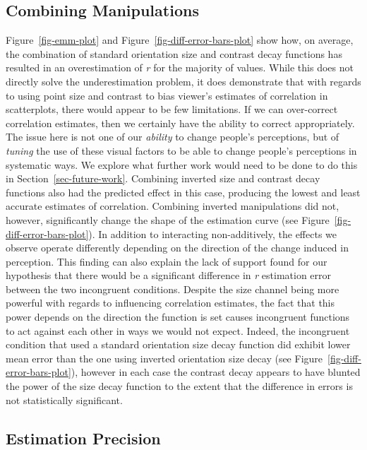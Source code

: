 \documentclass[manuscript, review, anonymous, screen]{acmart}
\begin{document}
\hypertarget{sec-combining}{%
\subsection{Combining Manipulations}\label{sec-combining}}

Figure~\ref{fig-emm-plot} and Figure~\ref{fig-diff-error-bars-plot} show
how, on average, the combination of standard orientation size and
contrast decay functions has resulted in an overestimation of \emph{r}
for the majority of values. While this does not directly solve the
underestimation problem, it does demonstrate that with regards to using
point size and contrast to bias viewer's estimates of correlation in
scatterplots, there would appear to be few limitations. If we can
over-correct correlation estimates, then we certainly have the ability
to correct appropriately. The issue here is not one of our
\emph{ability} to change people's perceptions, but of \emph{tuning} the
use of these visual factors to be able to change people's perceptions in
systematic ways. We explore what further work would need to be done to
do this in Section~\ref{sec-future-work}. Combining inverted size and
contrast decay functions also had the predicted effect in this case,
producing the lowest and least accurate estimates of correlation.
Combining inverted manipulations did not, however, significantly change
the shape of the estimation curve (see
Figure~\ref{fig-diff-error-bars-plot}). In addition to interacting
non-additively, the effects we observe operate differently depending on
the direction of the change induced in perception. This finding can also
explain the lack of support found for our hypothesis that there would be
a significant difference in \emph{r} estimation error between the two
incongruent conditions. Despite the size channel being more powerful
with regards to influencing correlation estimates, the fact that this
power depends on the direction the function is set causes incongruent
functions to act against each other in ways we would not expect. Indeed,
the incongruent condition that used a standard orientation size decay
function did exhibit lower mean error than the one using inverted
orientation size decay (see Figure~\ref{fig-diff-error-bars-plot}),
however in each case the contrast decay appears to have blunted the
power of the size decay function to the extent that the difference in
errors is not statistically significant.

\hypertarget{estimation-precision}{%
\subsection{Estimation Precision}\label{estimation-precision}}
\end{document}
